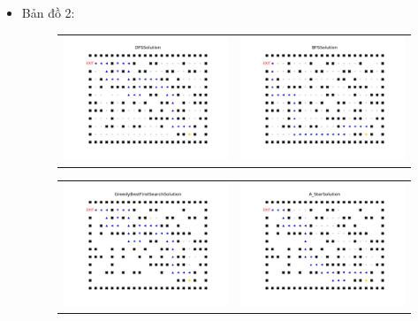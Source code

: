\documentclass[11pt]{article} %
\begin{document}
\begin{itemize}
	\newpage
	\item Bản đồ 2:
	\begin{figure}[h] \label{bd2}
		\centering
		\begin{tabular}{cc}
			\includegraphics[width=8cm]{Figures/fg2_dfs.png} &
			\includegraphics[width=8cm]{Figures/fg2_bfs.png} \\
		\end{tabular}
	\end{figure}
	\begin{figure}[h] \label{Hình 2}
		\centering
		\begin{tabular}{cc}
			\includegraphics[width=8cm]{Figures/fg2_gbfs.png} &
			\includegraphics[width=8cm]{Figures/fg2_astar.png}

\end{tabular}
\end{figure}
\end{itemize}
\end{document}
